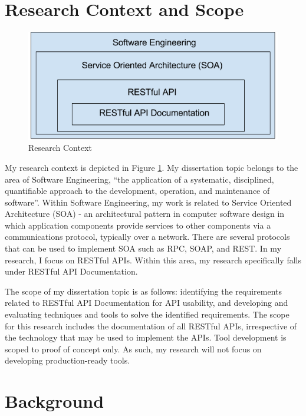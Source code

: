 \documentclass[11pt,oneside]{book}
\begin{document}
\section{Research Context and Scope}

\begin{figure}[bth]
  \includegraphics[width=\linewidth]{context.png}
  \caption{Research Context}
  \label{fig:context}
\end{figure}

My research context is depicted in Figure \ref{fig:context}. My dissertation topic belongs to the area of Software Engineering, “the application of a systematic, disciplined, quantifiable approach to the development, operation, and maintenance of software”. Within Software Engineering, my work is related to Service Oriented Architecture (SOA) -  an architectural pattern in computer software design in which application components provide services to other components via a communications protocol, typically over a network. There are several protocols that can be used to implement SOA such as RPC, SOAP, and REST. In my research, I focus on RESTful APIs. Within this area, my research specifically falls under RESTful API Documentation.

The scope of my dissertation topic is as follows: identifying the requirements related to RESTful API Documentation for API usability, and developing and evaluating techniques and tools to solve the identified requirements. The scope for this research includes the documentation of all RESTful APIs, irrespective of the technology that may be used to implement the APIs. Tool development is scoped to proof of concept only. As such, my research will not focus on developing production-ready tools.

\section{Background}
\end{document}

